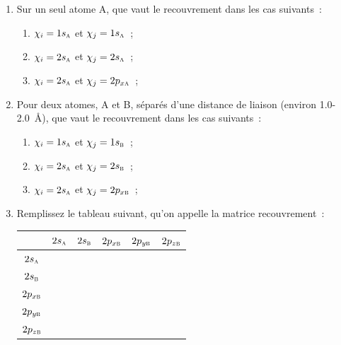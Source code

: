 \begin{enumerate}

\item Sur un seul atome A, que vaut le recouvrement dans les cas suivants~:
\begin{enumerate}
\item $\chi_i = 1s_\textsc{a}$ et $\chi_j = 1s_\textsc{a}$~;
\item $\chi_i = 2s_\textsc{a}$ et $\chi_j = 2s_\textsc{a}$~;
\item $\chi_i = 2s_\textsc{a}$ et $\chi_j = 2p_{x\textsc{a}}$~;
\end{enumerate}

\item Pour deux atomes, A et B, s\'epar\'es d'une distance de liaison 
(environ 1.0-2.0~\AA), que vaut le recouvrement dans les cas suivants~: 
\begin{enumerate}
\item $\chi_i = 1s_\textsc{a}$ et $\chi_j = 1s_\textsc{b}$~;
\item $\chi_i = 2s_\textsc{a}$ et $\chi_j = 2s_\textsc{b}$~;
\item $\chi_i = 2s_\textsc{a}$ et $\chi_j = 2p_{x\textsc{b}}$~;
\end{enumerate}

\item Remplissez le tableau suivant, qu'on appelle la matrice recouvrement~:

\begin{tabular}{|c||c|c|c|c|c|}
\hline
                   & $2s_\textsc{a}$ & $2s_\textsc{b}$ & $2p_{x\textsc{b}}$ & $2p_{y\textsc{b}}$ & $2p_{z\textsc{b}}$ \\
\hline\hline
$2s_\textsc{a}$     &&&&& \\ \hline
$2s_\textsc{b}$     &&&&& \\ \hline
$2p_{x\textsc{b}}$  &&&&& \\ \hline
$2p_{y\textsc{b}}$  &&&&& \\ \hline
$2p_{z\textsc{b}}$  &&&&& \\ \hline
\end{tabular}


\end{enumerate}
